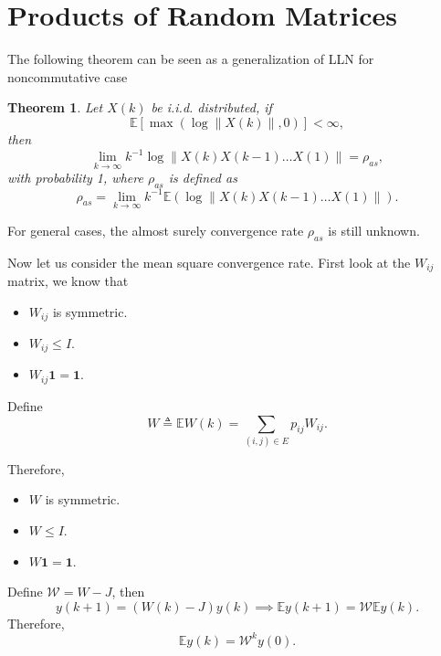\documentclass{article}
\newtheorem{theorem}{Theorem}
\begin{document}
\section{Products of Random Matrices}
The following theorem can be seen as a generalization of LLN for noncommutative case
\begin{theorem}
  Let $X(k)$ be i.i.d. distributed, if
  \begin{displaymath}
   \mathbb E \left[\max(\log\|X(k)\|,0) \right]<\infty,
  \end{displaymath}
  then
  \begin{displaymath}
    \lim_{k\rightarrow\infty} k^{-1}\log\|X(k)X(k-1)\dots X(1)\| = \rho_{as},
  \end{displaymath}
  with probability 1, where $\rho_{as}$ is defined as
  \begin{displaymath}
    \rho_{as} =  \lim_{k\rightarrow\infty} k^{-1}\mathbb E\left(\log\|X(k)X(k-1)\dots X(1)\|\right).
  \end{displaymath}
\end{theorem}

For general cases, the almost surely convergence rate $\rho_{as}$ is still unknown.

Now let us consider the mean square convergence rate. First look at the $W_{ij}$ matrix, we know that
\begin{itemize}
  \item $W_{ij}$ is symmetric.
  \item $W_{ij}\leq I$. 
  \item $W_{ij}\mathbf 1 = \mathbf 1$.
\end{itemize}

Define 
\begin{displaymath}
  W \triangleq \mathbb E W(k) = \sum_{(i,j)\in E} p_{ij}W_{ij}.
\end{displaymath}

Therefore,
\begin{itemize}
  \item $W$ is symmetric.
  \item $W\leq I$. 
  \item $W\mathbf 1 = \mathbf 1$.
\end{itemize}

Define $\mathcal W = W-J$, then
\begin{displaymath}
 y(k+1) =   (W(k)-J) y(k)\implies \mathbb E y(k+1) = \mathcal W \mathbb E y(k).
\end{displaymath}
Therefore,
\begin{displaymath}
\mathbb E y(k)  = \mathcal W^k y(0).
\end{displaymath}
\end{document}
